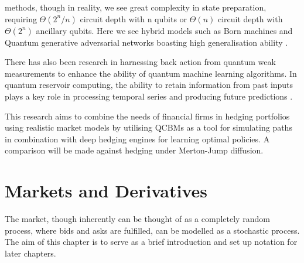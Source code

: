\documentclass[12pt]{article}
\newcommand{\newp}
    {
    \vskip 0.5cm 
  }
\numberwithin{equation}{section}
\begin{document}
methods, though in reality, we see great complexity in state preparation, requiring 
$\Theta(2^n/n)$ circuit depth with n qubits or $\Theta(n)$ circuit depth with 
$\Theta(2^n)$ ancillary qubits\autocite{zhang_quantum_2022}. Here we see hybrid 
models such as Born machines
and Quantum generative adversarial networks boasting high generalisation ability
\autocite{ganguly_implementing_nodate,gili_2022_do,horowitz_quantum_2022}.
\newp
There has also been research in harnessing back action from quantum weak 
measurements to enhance the ability of quantum machine learning algorithms. 
In quantum reservoir computing,
the ability to retain information from past inputs plays a key role in processing 
temporal series and producing future predictions
\autocite{franceschetto_harnessing_2024,fujii_quantum_2020,garcia-beni_squeezing_2024,mujal_time-series_2023}.
\newp
This research aims to combine the needs of financial firms in hedging portfolios
using realistic market models by utilising QCBMs as a tool 
for simulating paths in combination with deep hedging engines for learning 
optimal policies. A comparison will be made against hedging under Merton-Jump 
diffusion. 
\clearpage
\section{Markets and Derivatives}
The market, though inherently can be thought of as a completely random process,
where bids and asks are fulfilled, can be modelled as a stochastic process. The 
aim of this chapter is to serve as a brief introduction and set up notation for 
later chapters. \\
\end{document}
